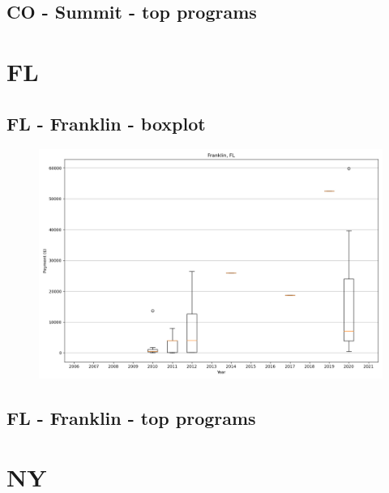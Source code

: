 \subsection*{CO - Summit - top programs}

\newpage
\section*{FL}
\subsection*{FL - Franklin - boxplot}
\begin{figure}[h]
\centering
\includegraphics[width=7in]{../output/boxplots/counties/Franklin-FL_boxplot.png}
\end{figure}


\subsection*{FL - Franklin - top programs}

\newpage
\section*{NY}
